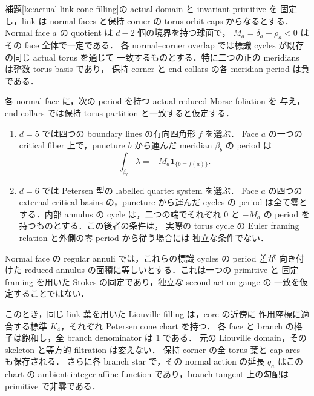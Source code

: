 \begin{proposition}
\label{ke:actual-anchor-fan-criterion}
補題\ref{ke:actual-link-cone-filling}の actual domain と invariant primitive を
固定し，link は normal faces と保持 corner の torus-orbit caps からなるとする．
Normal face $a$ の quotient は $d-2$ 個の境界を持つ球面で，
$M_a=\delta_a-\rho_a<0$ はその face 全体で一定である．
各 normal--corner overlap では標識 cycles が既存の同じ actual torus を通じて
一致するものとする．特に二つの正の meridians は整数 torus basis であり，
保持 corner と end collars の各 meridian period は負である．

各 normal face に，次の period を持つ actual reduced Morse foliation を
与え，end collars では保持 torus partition と一致すると仮定する．
\begin{enumerate}
\item $d=5$ では四つの boundary lines の有向四角形 $f$ を選ぶ．
Face $a$ の一つの critical fiber 上で，puncture $b$ から運んだ meridian
$\beta_b$ の period は
\[
 \int_{\beta_b}\lambda=-M_a\mathbf1_{\{b=f(a)\}}.
\]
\item $d=6$ では Petersen 型の labelled quartet system を選ぶ．
Face $a$ の四つの external critical basins の，puncture から運んだ cycles の
period は全て零とする．内部 annulus の cycle は，二つの端でそれぞれ
$0$ と $-M_a$ の period を持つものとする．この後者の条件は，
実際の torus cycle の Euler framing relation と外側の零 period から従う場合には
独立な条件でない．
\end{enumerate}
Normal face の regular annuli では，これらの標識 cycles の period 差が
向き付けた reduced annulus の面積に等しいとする．これは一つの primitive と
固定 framing を用いた Stokes の同定であり，独立な second-action gauge の
一致を仮定することではない．

このとき，同じ link 葉を用いた Liouville filling は，core の近傍に
作用座標に適合する標準 $K_4$，それぞれ Petersen cone chart を持つ．
各 face と branch の格子は飽和し，全 branch denominator は $1$ である．
元の Liouville domain，その skeleton と等方的 filtration は変えない．
保持 corner の全 torus 葉と cap arcs も保存される．
さらに各 branch star で，その normal action の延長 $q_a$ はこの chart の
ambient integer affine function であり，branch tangent 上の勾配は primitive
で非零である．
\end{proposition}

